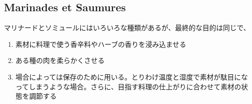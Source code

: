 \hypertarget{marinades-et-saumucres}{%
\subsection{Marinades et Saumures}\label{marinades-et-saumucres}}

 

マリナードとソミュールにはいろいろな種類があるが、最終的な目的は同じで、

\begin{enumerate}
\def\labelenumi{\arabic{enumi}.}
\item
  素材に料理で使う香辛料やハーブの香りを浸み込ませる
\item
  ある種の肉を柔らかくさせる
\item
  場合によっては保存のために用いる。とりわけ温度と湿度で素材が駄目になってしまうような場合。さらに、目指す料理の仕上がりに合わせて素材の状態を調節する
\end{enumerate}
